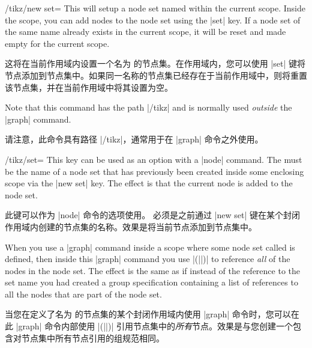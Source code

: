\begin{key}{/tikz/new set=}
    This will setup a node set named  within the current scope.
    Inside the scope, you can add nodes to the node set using the |set| key. If
    a node set of the same name already exists in the current scope, it will be
    reset and made empty for the current scope.

    这将在当前作用域内设置一个名为  的节点集。在作用域内，您可以使用 |set| 键将节点添加到节点集中。如果同一名称的节点集已经存在于当前作用域中，则将重置该节点集，并在当前作用域中将其设置为空。

    Note that this command has the path |/tikz| and is normally used
    \emph{outside} the |graph| command.

    请注意，此命令具有路径 |/tikz|，通常用于在 |graph| 命令之外使用。
\end{key}
%
\begin{key}{/tikz/set=}
    This key can be used as an option with a |node| command. The  must be the name of a node set that has previously been created
    inside some enclosing scope via the |new set| key. The effect is that the
    current node is added to the node set.

    此键可以作为 |node| 命令的选项使用。  必须是之前通过 |new set| 键在某个封闭作用域内创建的节点集的名称。效果是将当前节点添加到节点集中。
\end{key}

When you use a |graph| command inside a scope where some node set called
 is defined, then inside this |graph| command you use
|(||)| to reference \emph{all} of the nodes in the node set. The
effect is the same as if instead of the reference to the set name you had
created a group specification containing a list of references to all the nodes
that are part of the node set.

当您在定义了名为  的节点集的某个封闭作用域内使用 |graph| 命令时，您可以在此 |graph| 命令内部使用 |(||)| 引用节点集中的\emph{所有}节点。效果是与您创建一个包含对节点集中所有节点引用的组规范相同。
\begin{codeexample}[preamble={\usetikzlibrary{graphs}}]
\end{codeexample}

